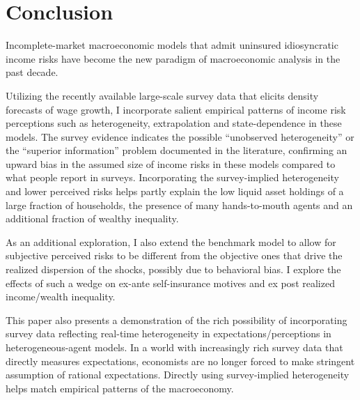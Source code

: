 \hypertarget{conclusion}{%
\section{Conclusion}\label{conclusion}}

Incomplete-market macroeconomic models that admit uninsured idiosyncratic income risks have become the new paradigm of macroeconomic analysis in the past decade. 


Utilizing the recently available large-scale survey data that elicits density forecasts of wage growth, I incorporate salient empirical patterns of income risk perceptions such as heterogeneity, extrapolation and state-dependence in these models. The survey evidence indicates the possible ``unobserved heterogeneity'' or the ``superior information'' problem documented in the literature, confirming an upward bias in the assumed size of income risks in these models compared to what people report in surveys. Incorporating the survey-implied heterogeneity and lower perceived risks helps partly explain the low liquid asset holdings of a large fraction of households, the presence of many hands-to-mouth agents and an additional fraction of wealthy inequality. 

As an additional exploration, I also extend the benchmark model to allow for subjective perceived risks to be different from the objective ones that drive the realized dispersion of the shocks, possibly due to behavioral bias. I explore the effects of such a wedge on ex-ante self-insurance motives and ex post realized income/wealth inequality.  

This paper also presents a demonstration of the rich possibility of incorporating survey data reflecting real-time heterogeneity in expectations/perceptions in heterogeneous-agent models. In a world with increasingly rich survey data that directly measures expectations, economists are no longer forced to make stringent  assumption of rational expectations. Directly using survey-implied heterogeneity helps match empirical patterns of the macroeconomy. 
